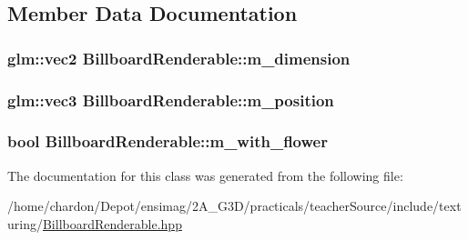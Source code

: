 \subsection{Member Data Documentation}
\hypertarget{classBillboardRenderable_a69542c4170487272fea0bf0e207ca376}{
\subsubsection[{m\+\_\+dimension}]{\setlength{\rightskip}{0pt plus 5cm}glm\+::vec2 Billboard\+Renderable\+::m\+\_\+dimension\hspace{0.3cm}{\ttfamily [private]}}}\label{classBillboardRenderable_a69542c4170487272fea0bf0e207ca376}
\hypertarget{classBillboardRenderable_aa0477db068d4c9a67aaa9031871ae8e4}{
\subsubsection[{m\+\_\+position}]{\setlength{\rightskip}{0pt plus 5cm}glm\+::vec3 Billboard\+Renderable\+::m\+\_\+position\hspace{0.3cm}{\ttfamily [private]}}}\label{classBillboardRenderable_aa0477db068d4c9a67aaa9031871ae8e4}
\hypertarget{classBillboardRenderable_a9f034ff978eb852437ffa91cfcdc9b6e}{
\subsubsection[{m\+\_\+with\+\_\+flower}]{\setlength{\rightskip}{0pt plus 5cm}bool Billboard\+Renderable\+::m\+\_\+with\+\_\+flower\hspace{0.3cm}{\ttfamily [private]}}}\label{classBillboardRenderable_a9f034ff978eb852437ffa91cfcdc9b6e}


The documentation for this class was generated from the following file\+:\begin{DoxyCompactItemize}
\item 
/home/chardon/\+Depot/ensimag/2\+A\+\_\+\+G3\+D/practicals/teacher\+Source/include/texturing/\hyperlink{BillboardRenderable_8hpp}{Billboard\+Renderable.\+hpp}\end{DoxyCompactItemize}
